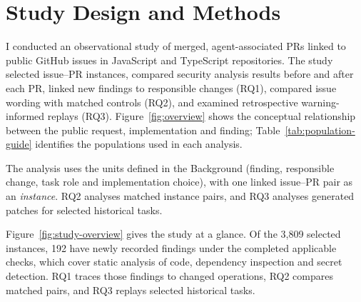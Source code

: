 \documentclass[acmsmall,screen,nonacm,review]{acmart}
\begin{document}
\section{Study Design and Methods}\label{sec:methods}

I conducted an observational study of merged, agent-associated PRs linked to public GitHub issues in JavaScript and TypeScript repositories. The study selected issue--PR instances, compared security analysis results before and after each PR, linked new findings to responsible changes (RQ1), compared issue wording with matched controls (RQ2), and examined retrospective warning-informed replays (RQ3). Figure~\ref{fig:overview} shows the conceptual relationship between the public request, implementation and finding; Table~\ref{tab:population-guide} identifies the populations used in each analysis.

The analysis uses the units defined in the Background (finding, responsible change, task role and implementation choice), with one linked issue--PR pair as an \emph{instance}. RQ2 analyses matched instance pairs, and RQ3 analyses generated patches for selected historical tasks.

Figure~\ref{fig:study-overview} gives the study at a glance. Of the 3,809 selected instances, 192 have newly recorded findings under the completed applicable checks, which cover static analysis of code, dependency inspection and secret detection. RQ1 traces those findings to changed operations, RQ2 compares matched pairs, and RQ3 replays selected historical tasks.
\end{document}
